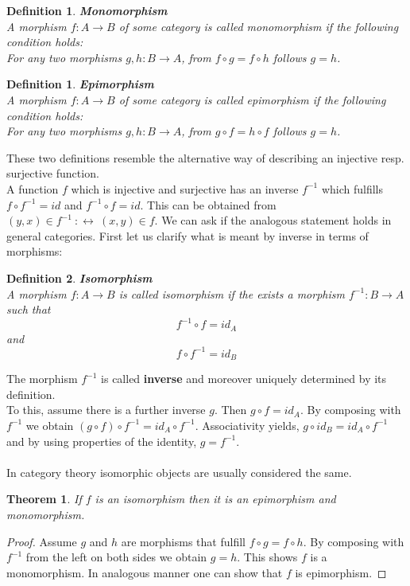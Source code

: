 \documentclass[17pt]{extarticle}
\newtheorem{definition}{Definition}
\newtheorem*{definition*}{Definition}
\newtheorem*{theorem*}{Theorem}
\begin{document}
\begin{definition*}
	\textbf{Monomorphism}\\
	A morphism $f:A\rightarrow B$ of some category is called monomorphism if the following condition holds:\\
	For any two morphisms $g,h:B\rightarrow A$, from $f\circ g=f\circ h$ follows $g=h$.	
\end{definition*}

\begin{definition}
	\textbf{Epimorphism}\\
	A morphism $f:A\rightarrow B$ of some category is called epimorphism if the following condition holds:\\
	For any two morphisms $g,h:B\rightarrow A$, from $g\circ f=h\circ f$ follows $g=h$.	
\end{definition}

These two definitions resemble the alternative way of describing an injective resp. surjective function.\\

A function $f$ which is injective and surjective has an inverse $f^{-1}$ which fulfills $f\circ f^{-1}=id$ and $f^{-1}\circ f=id$. This can be obtained from $(y,x)\in f^{-1} \ :\leftrightarrow \ (x,y)\in f$. We can ask if the analogous statement holds in general categories. First let us clarify what is meant by inverse in terms of morphisms:

\begin{definition*}
	\textbf{Isomorphism}\\
	A morphism $f:A\rightarrow B$ is called isomorphism if the exists a morphism $f^{-1}:B\rightarrow A$ such that
	$$f^{-1}\circ f=id_A$$
	and
	$$f\circ f^{-1}=id_B$$	
\end{definition*}

The morphism $f^{-1}$ is called \textbf{inverse} and moreover uniquely determined by its definition.\\
To this, assume there is a further inverse $g$.
Then $g\circ f=id_A$. By composing with $f^{-1}$ we obtain $(g\circ f)\circ f^{-1}=id_A\circ f^{-1}$.
Associativity yields, $g\circ id_B=id_A \circ f^{-1}$ and by using properties of the identity, $g=f^{-1}$.\\ \\
In category theory isomorphic objects are usually considered the same. 

\begin{theorem*}
	If $f$ is an isomorphism then it is an epimorphism and monomorphism.
\end{theorem*}
\begin{proof}
	Assume $g$ and $h$ are morphisms that fulfill $f\circ g=f\circ h$. By composing with $f^{-1}$ from the left on
	both sides we obtain $g=h$. This shows $f$ is a monomorphism. In analogous manner one can show that $f$
	is epimorphism.
\end{proof}
\end{document}
